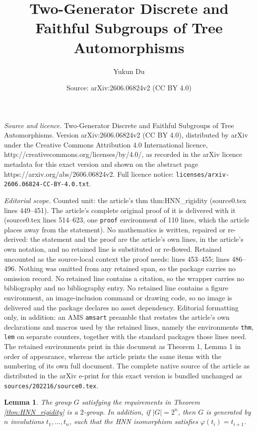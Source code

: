 \documentclass[10pt,a4paper]{amsart}
\title{Two-Generator Discrete and Faithful Subgroups of Tree Automorphisms}
\author{Yukun Du}
\date{Source: arXiv:2606.06824v2 (CC BY 4.0)}
\newtheorem{lem}{Lemma}
\begin{document}
\maketitle

\noindent\emph{Source and licence.} Two-Generator Discrete and Faithful Subgroups of Tree Automorphisms. Version arXiv:2606.06824v2 (CC BY 4.0), distributed by arXiv under the Creative Commons Attribution 4.0 International licence, http://creativecommons.org/licenses/by/4.0/, as recorded in the arXiv licence metadata for this exact version and shown on the abstract page https://arxiv.org/abs/2606.06824v2. Full licence notice: \texttt{licenses/arxiv-2606.06824-CC-BY-4.0.txt}.\par\smallskip

\noindent\textit{Editorial scope.} Counted unit: the article's thm thm:HNN\_rigidity (source0.tex lines 449--451). The article's complete original proof of it is delivered with it (source0.tex lines 514--623, one \texttt{proof} environment of 110 lines, which the article places away from the statement). No mathematics is written, repaired or re-derived: the statement and the proof are the article's own lines, in the article's own notation, and no retained line is substituted or re-flowed.  Retained uncounted as the source-local context the proof needs: lines 453--455; lines 486--496.  Nothing was omitted from any retained span, so the package carries no omission record.  No retained line contains a citation, so the wrapper carries no bibliography and no bibliography entry.  No retained line contains a figure environment, an image-inclusion command or drawing code, so no image is delivered and the package declares no asset dependency.  Editorial formatting only, in addition: an AMS \texttt{amsart} preamble that restates the article's own declarations and macros used by the retained lines, namely the environments \texttt{thm}, \texttt{lem} on separate counters, together with the standard packages those lines need.  The retained environments print in this document as Theorem 1, Lemma 1 in order of appearance, whereas the article prints the same items with the numbering of its own full document.  The complete native source of the article as distributed in the arXiv e-print for this exact version is bundled unchanged as \texttt{sources/202216/source0.tex}.
\begin{lem}\label{lem:pres}
    The group $G$ satisfying the requirements in Theorem \ref{thm:HNN_rigidity} is a $2$-group. In addition, if $\lvert G\rvert = 2^n$, then $G$ is generated by $n$ involutions $t_1,\dots, t_n$, such that the HNN isomorphism satisfies $\varphi(t_i) = t_{i+1}$.
\end{lem}
\end{document}
